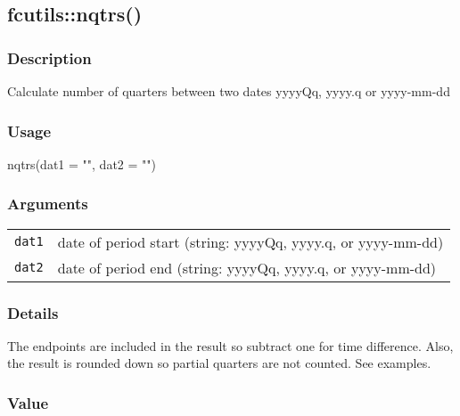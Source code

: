 \documentclass[
  letterpaper,
  DIV=11,
  numbers=noendperiod]{scrreport}
\newenvironment{Shaded}{\begin{snugshade}}{\end{snugshade}}
\newcommand{\AttributeTok}[1]{\textcolor[rgb]{0.40,0.45,0.13}{#1}}
\newcommand{\FunctionTok}[1]{\textcolor[rgb]{0.28,0.35,0.67}{#1}}
\newcommand{\NormalTok}[1]{\textcolor[rgb]{0.00,0.23,0.31}{#1}}
\newcommand{\StringTok}[1]{\textcolor[rgb]{0.13,0.47,0.30}{#1}}
\begin{document}
\subsection{fcutils::nqtrs()}\label{fcutilsnqtrs}

\subsubsection{Description}\label{description-17}

Calculate number of quarters between two dates yyyyQq, yyyy.q or
yyyy-mm-dd

\subsubsection{Usage}\label{usage-17}

\begin{Shaded}
\begin{Highlighting}[]
\FunctionTok{nqtrs}\NormalTok{(}\AttributeTok{dat1 =} \StringTok{""}\NormalTok{, }\AttributeTok{dat2 =} \StringTok{""}\NormalTok{)}
\end{Highlighting}
\end{Shaded}

\subsubsection{Arguments}\label{arguments-17}

\begin{longtable}[]{@{}ll@{}}
\toprule\noalign{}
\endhead
\bottomrule\noalign{}
\endlastfoot
\texttt{dat1} & date of period start (string: yyyyQq, yyyy.q, or
yyyy-mm-dd) \\
\texttt{dat2} & date of period end (string: yyyyQq, yyyy.q, or
yyyy-mm-dd) \\
\end{longtable}

\subsubsection{Details}\label{details-8}

The endpoints are included in the result so subtract one for time
difference. Also, the result is rounded down so partial quarters are not
counted. See examples.

\subsubsection{Value}\label{value-17}
\end{document}
